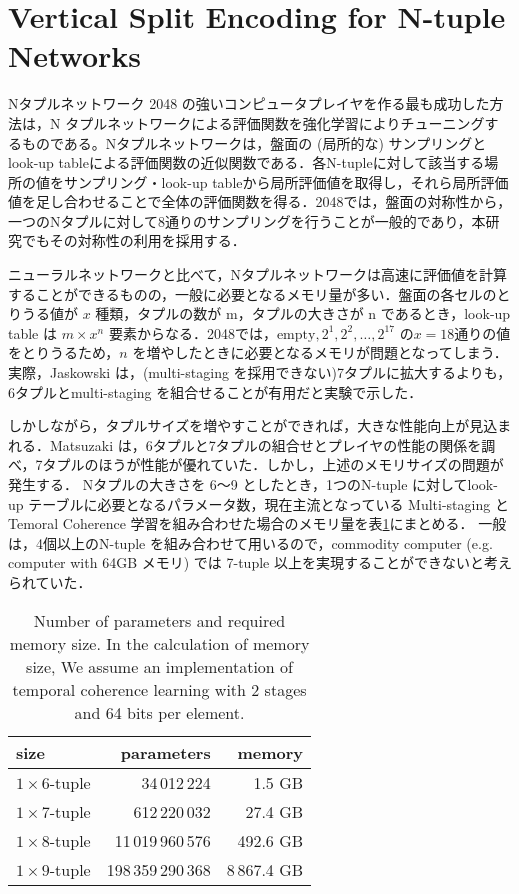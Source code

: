 \section{Vertical Split Encoding for N-tuple Networks}

Nタプルネットワーク
2048 の強いコンピュータプレイヤを作る最も成功した方法は，N タプルネットワークによる評価関数を強化学習によりチューニングするものである。Nタプルネットワークは，盤面の (局所的な) サンプリングとlook-up tableによる評価関数の近似関数である．各N-tupleに対して該当する場所の値をサンプリング・look-up tableから局所評価値を取得し，それら局所評価値を足し合わせることで全体の評価関数を得る．2048では，盤面の対称性から，一つのNタプルに対して8通りのサンプリングを行うことが一般的であり，本研究でもその対称性の利用を採用する．

ニューラルネットワークと比べて，Nタプルネットワークは高速に評価値を計算することができるものの，一般に必要となるメモリ量が多い．盤面の各セルのとりうる値が $x$ 種類，タプルの数が m，タプルの大きさが n であるとき，look-up table は $m \times x^n$ 要素からなる．2048では，$\mbox{empty}, 2^1, 2^2, \ldots, 2^17$ の$x=18$通りの値をとりうるため，$n$ を増やしたときに必要となるメモリが問題となってしまう．実際，Jaskowski は，(multi-staging を採用できない)7タプルに拡大するよりも，6タプルとmulti-staging を組合せることが有用だと実験で示した．

しかしながら，タプルサイズを増やすことができれば，大きな性能向上が見込まれる．Matsuzaki は，6タプルと7タプルの組合せとプレイヤの性能の関係を調べ，7タプルのほうが性能が優れていた．しかし，上述のメモリサイズの問題が発生する．
Nタプルの大きさを 6～9 としたとき，1つのN-tuple に対してlook-up テーブルに必要となるパラメータ数，現在主流となっている Multi-staging と Temoral Coherence 学習を組み合わせた場合のメモリ量を表\ref{table:NTupleMemory}にまとめる．
一般は，4個以上のN-tuple を組み合わせて用いるので，commodity computer (e.g. computer with 64GB メモリ) では 7-tuple 以上を実現することができないと考えられていた．
\begin{table}
\setlength{\doublerulesep}{.4pt}
 \caption{Number of parameters and required memory size.  In the calculation of memory size, We assume an implementation of temporal coherence learning with 2 stages and 64 bits per element.}
\label{table:NTupleMemory}
 \begin{tabular}{l|rr}
\hline\hline
  size & parameters & memory \\
\hline
  $1 \times 6$-tuple & 34\,012\,224 & 1.5 GB \\
  $1 \times 7$-tuple & 612\,220\,032 & 27.4 GB \\
  $1 \times 8$-tuple & 11\,019\,960\,576 & 492.6 GB \\
  $1 \times 9$-tuple & 198\,359\,290\,368 & 8\,867.4 GB \\
\hline
 \end{tabular}
\end{table}

